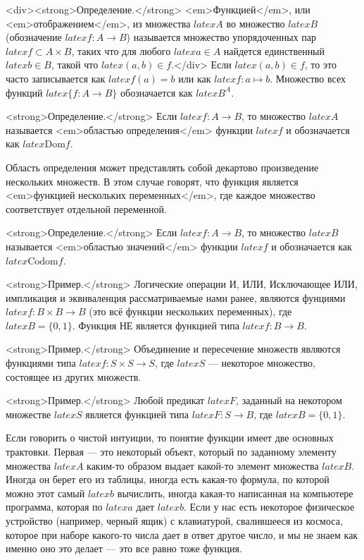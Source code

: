 <div><strong>Определение.</strong> <em>Функцией</em>, или <em>отображением</em>, из множества $latex A$ во множество $latex B$ (обозначение $latex f:A\to B$) называется множество упорядоченных пар $latex f\subset A\times B$, таких что для любого $latex a\in A$ найдется единственный $latex b\in B$, такой что $latex (a, b) \in f$.</div>
Если $latex (a, b) \in f$, то это часто записывается как $latex f(a) = b$ или как $latex f:a \mapsto b$. Множество всех функций $latex \{f: A\to B\}$ обозначается как $latex B^A$.

<strong>Определение.</strong> Если $latex f:A \to B$, то множество $latex A$ называется <em>областью определения</em> функции $latex f$ и обозначается как $latex \mathrm{Dom} f$.

Область определения может представлять собой декартово произведение нескольких множеств. В этом случае говорят, что функция является <em>функцией нескольких переменных</em>, где каждое множество соответствует отдельной переменной.

<strong>Определение.</strong> Если $latex f:A \to B$, то множество $latex B$ называется <em>областью значений</em> функции $latex f$ и обозначается как $latex \mathrm{Codom} f$.

<strong>Пример.</strong> Логические операции И, ИЛИ, Исключающее ИЛИ, импликация и эквиваленция рассматриваемые нами ранее, являются фунциями $latex f:B\times B \to B$ (это всё функции нескольких переменных), где $latex B = \{0, 1\}$. Функция НЕ является функцией типа $latex f: B \to B$.

<strong>Пример.</strong> Объединение и пересечение множеств являются функциями типа $latex f: S \times S \to S$, где $latex S$ — некоторое множество, состоящее из других множеств.

<strong>Пример.</strong> Любой предикат $latex F$, заданный на некотором множестве $latex S$ является функцией типа $latex F: S \to B$, где $latex B = \{0, 1\}$.

Если говорить о чистой интуиции, то понятие функции имеет две основных трактовки. Первая — это некоторый объект, который по заданному элементу множества $latex A$ каким-то образом выдает какой-то элемент множества $latex B$. Иногда он берет его из таблицы, иногда есть какая-то формула, по которой можно этот самый $latex b$ вычислить, иногда какая-то написанная на компьютере программа, которая по $latex a$ дает $latex b$. Если у нас есть некоторое физическое устройство (например, черный ящик) с клавиатурой, свалившееся из космоса, которое при наборе какого-то числа дает в ответ другое число, и мы не знаем как именно оно это делает — это все равно тоже функция.

